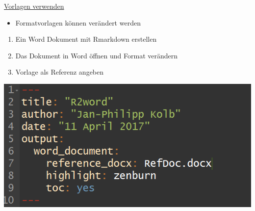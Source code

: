 \documentclass[ignorenonframetext,]{beamer}
\providecommand{\tightlist}{%
\setlength{\itemsep}{0pt}\setlength{\parskip}{0pt}}
\begin{document}
\begin{frame}{\href{http://rmarkdown.rstudio.com/articles_docx.html}{Vorlagen
verwenden}}

\begin{itemize}
\tightlist
\item
  Formatvorlagen können verändert werden
\end{itemize}

\begin{enumerate}
\def\labelenumi{\arabic{enumi}.}
\tightlist
\item
  Ein Word Dokument mit Rmarkdown erstellen
\item
  Das Dokument in Word öffnen und Format verändern
\item
  Vorlage als Referenz angeben
\end{enumerate}

\includegraphics{./tex2pdf.956/11c0eff26eb75855b817e44357dbae92e1838d58.png}

\end{frame}
\end{document}
